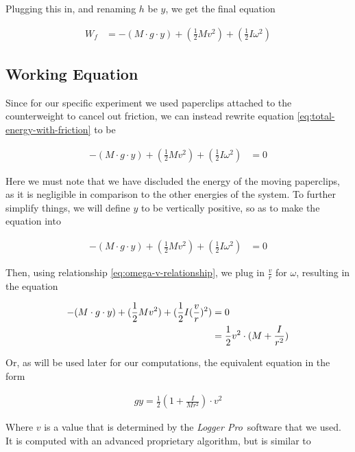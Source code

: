 \documentclass[coverpage]{article}
\newcommand{\softwareText}[1]{\textit{#1}\texttrademark}
\newcommand{\loggerpro}{\softwareText{Logger Pro}}
\begin{document}
	Plugging this in, and renaming $h$ be $y$, we get the final equation
	
	\newcommand{\mgy}{(M \cdot g \cdot y)}
	
	\begin{align}
		W_f &= -\mgy + (\frac{1}{2} M v^2) + (\frac{1}{2} I \omega^2) \label{eq:total-energy-with-friction}
	\end{align}
	
	\subsection{Working Equation}
	
	Since for our specific experiment we used paperclips attached to the counterweight to cancel out friction, we can instead rewrite equation \ref{eq:total-energy-with-friction} to be
	
	\begin{align}
		-\mgy + (\frac{1}{2} M v^2) + (\frac{1}{2} I \omega^2)&=0
	\end{align}
	
	Here we must note that we have discluded the energy of the moving paperclips, as it is negligible in comparison to the other energies of the system. To further simplify things, we will define $y$ to be vertically positive, so as to make the equation into
	
	\begin{align}
		-\mgy + (\frac{1}{2} M v^2) + (\frac{1}{2} I \omega^2)&=0
	\end{align}

	Then, using relationship \ref{eq:omega-v-relationship}, we plug in $\frac{v}{r}$ for $\omega$, resulting in the equation
	
	\begin{align}
		-\mgy + (\frac{1}{2} M v^2) + (\frac{1}{2} I (\frac{v}{r})^2)&=0 \notag \\
		&=\frac{1}{2} v^2 \cdot (M + \frac{I}{r^2})
	\end{align}

	Or, as will be used later for our computations, the equivalent equation in the form
	
	\begin{align}
		gy = \frac{1}{2}(1 + \frac{I}{Mr^2}) \cdot v^2 \label{eq:conservation-of-energy-gy-form}
	\end{align}
	
	Where $v$ is a value that is determined by the \loggerpro~software that we used. It is computed with an advanced proprietary algorithm, but is similar to
	
\end{document}
